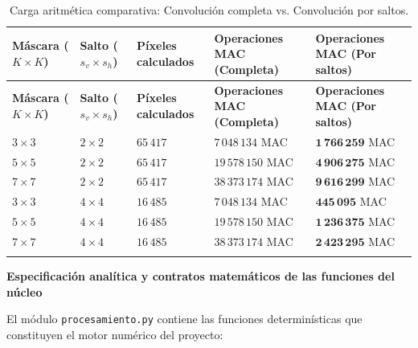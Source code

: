 \documentclass[11pt]{article}
\begin{document}
\begin{longtable}{>{\centering\arraybackslash}p{2.2cm}>{\centering\arraybackslash}p{2.2cm}>{\centering\arraybackslash}p{2.5cm}>{\centering\arraybackslash}p{3.5cm}>{\centering\arraybackslash}p{3.2cm}}
\caption{Carga aritmética comparativa: Convolución completa vs. Convolución por saltos.}\\
\toprule
\textbf{Máscara ($K\times K$)} & \textbf{Salto ($s_v \times s_h$)} & \textbf{Píxeles calculados} & \textbf{Operaciones MAC (Completa)} & \textbf{Operaciones MAC (Por saltos)} \\
\midrule\endfirsthead
\toprule
\textbf{Máscara ($K\times K$)} & \textbf{Salto ($s_v \times s_h$)} & \textbf{Píxeles calculados} & \textbf{Operaciones MAC (Completa)} & \textbf{Operaciones MAC (Por saltos)} \\
\midrule\endhead
$3 \times 3$ & $2 \times 2$ & $65\,417$ & $7\,048\,134$ MAC & $\mathbf{1\,766\,259}$ MAC \\
\cellcolor{azulClaro!40}$5 \times 5$ & \cellcolor{azulClaro!40}$2 \times 2$ & \cellcolor{azulClaro!40}$65\,417$ & \cellcolor{azulClaro!40}$19\,578\,150$ MAC & \cellcolor{azulClaro!40}$\mathbf{4\,906\,275}$ MAC \\
$7 \times 7$ & $2 \times 2$ & $65\,417$ & $38\,373\,174$ MAC & $\mathbf{9\,616\,299}$ MAC \\
\cellcolor{azulClaro!40}$3 \times 3$ & \cellcolor{azulClaro!40}$4 \times 4$ & \cellcolor{azulClaro!40}$16\,485$ & \cellcolor{azulClaro!40}$7\,048\,134$ MAC & \cellcolor{azulClaro!40}$\mathbf{445\,095}$ MAC \\
$5 \times 5$ & $4 \times 4$ & $16\,485$ & $19\,578\,150$ MAC & $\mathbf{1\,236\,375}$ MAC \\
\cellcolor{azulClaro!40}$7 \times 7$ & \cellcolor{azulClaro!40}$4 \times 4$ & \cellcolor{azulClaro!40}$16\,485$ & \cellcolor{azulClaro!40}$38\,373\,174$ MAC & \cellcolor{azulClaro!40}$\mathbf{2\,423\,295}$ MAC \\
\bottomrule
\label{tab:analisis_operaciones_mac}
\end{longtable}

\textbf{Especificación analítica y contratos matemáticos de las funciones del núcleo}

El módulo \texttt{procesamiento.py} contiene las funciones determinísticas que constituyen el motor numérico del proyecto:
\end{document}
